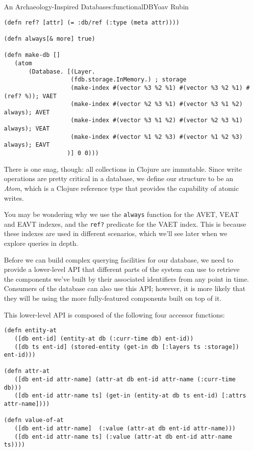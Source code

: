 \begin{aosachapter}{An Archaeology-Inspired Database}{s:functionalDB}{Yoav Rubin}
\begin{verbatim}
(defn ref? [attr] (= :db/ref (:type (meta attr))))

(defn always[& more] true)

(defn make-db []
   (atom 
       (Database. [(Layer.
                   (fdb.storage.InMemory.) ; storage
                   (make-index #(vector %3 %2 %1) #(vector %3 %2 %1) #(ref? %)); VAET                     
                   (make-index #(vector %2 %3 %1) #(vector %3 %1 %2) always); AVET                        
                   (make-index #(vector %3 %1 %2) #(vector %2 %3 %1) always); VEAT                       
                   (make-index #(vector %1 %2 %3) #(vector %1 %2 %3) always); EAVT
                  )] 0 0)))
\end{verbatim}

There is one snag, though: all collections in Clojure are immutable.
Since write operations are pretty critical in a database, we define our
structure to be an \emph{Atom}, which is a Clojure reference type that
provides the capability of atomic writes.

You may be wondering why we use the \texttt{always} function for the
AVET, VEAT and EAVT indexes, and the \texttt{ref?} predicate for the
VAET index. This is because these indexes are used in different
scenarios, which we'll see later when we explore queries in depth.

\label{basic-accessors}

Before we can build complex querying facilities for our database, we
need to provide a lower-level API that different parts of the system can
use to retrieve the components we've built by their associated
identifiers from any point in time. Consumers of the database can also
use this API; however, it is more likely that they will be using the
more fully-featured components built on top of it.

This lower-level API is composed of the following four accessor
functions:

\begin{verbatim}
(defn entity-at
   ([db ent-id] (entity-at db (:curr-time db) ent-id))
   ([db ts ent-id] (stored-entity (get-in db [:layers ts :storage]) ent-id)))

(defn attr-at
   ([db ent-id attr-name] (attr-at db ent-id attr-name (:curr-time db)))
   ([db ent-id attr-name ts] (get-in (entity-at db ts ent-id) [:attrs attr-name])))

(defn value-of-at
   ([db ent-id attr-name]  (:value (attr-at db ent-id attr-name)))
   ([db ent-id attr-name ts] (:value (attr-at db ent-id attr-name ts))))


\end{verbatim}
\end{aosachapter}
